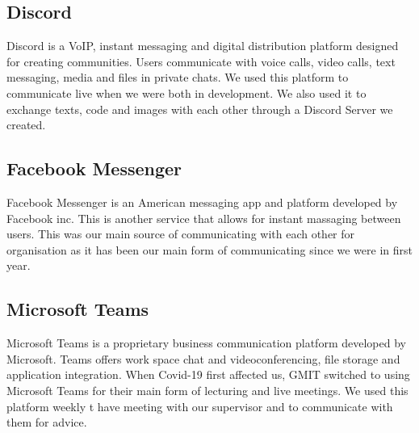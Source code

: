 \subsection{Discord}
Discord is a VoIP, instant messaging and digital distribution platform designed for creating communities. Users communicate with voice calls, video calls, text messaging, media and files in private chats. We used this platform to communicate live when we were both in development. We also used it to exchange texts, code and images with each other through a Discord Server we created.

\subsection{Facebook Messenger}
Facebook Messenger is an American messaging app and platform developed by Facebook inc. This is another service that allows for instant massaging between users. This was our main source of communicating with each other for organisation as it has been our main form of communicating since we were in first year.

\subsection{Microsoft Teams}
Microsoft Teams is a proprietary business communication platform developed by Microsoft. Teams offers work space chat and videoconferencing, file storage and application integration. When Covid-19 first affected us, GMIT switched to using Microsoft Teams for their main form of lecturing and live meetings. We used this platform weekly t have meeting with our supervisor and to communicate with them for advice.


